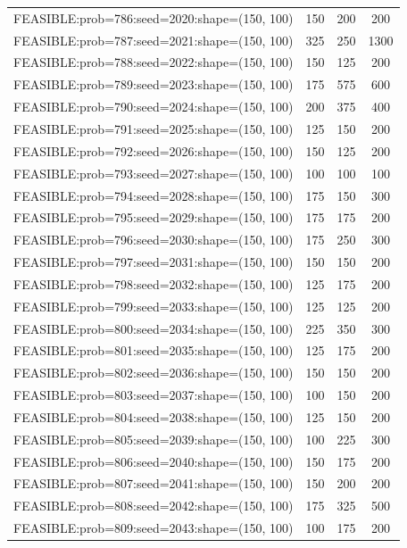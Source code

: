 \begin{longtable}{lccc}
FEASIBLE:prob=786:seed=2020:shape=(150, 100) &  150 &   200 &    200 \\
FEASIBLE:prob=787:seed=2021:shape=(150, 100) &  325 &   250 &   1300 \\
FEASIBLE:prob=788:seed=2022:shape=(150, 100) &  150 &   125 &    200 \\
FEASIBLE:prob=789:seed=2023:shape=(150, 100) &  175 &   575 &    600 \\
FEASIBLE:prob=790:seed=2024:shape=(150, 100) &  200 &   375 &    400 \\
FEASIBLE:prob=791:seed=2025:shape=(150, 100) &  125 &   150 &    200 \\
FEASIBLE:prob=792:seed=2026:shape=(150, 100) &  150 &   125 &    200 \\
FEASIBLE:prob=793:seed=2027:shape=(150, 100) &  100 &   100 &    100 \\
FEASIBLE:prob=794:seed=2028:shape=(150, 100) &  175 &   150 &    300 \\
FEASIBLE:prob=795:seed=2029:shape=(150, 100) &  175 &   175 &    200 \\
FEASIBLE:prob=796:seed=2030:shape=(150, 100) &  175 &   250 &    300 \\
FEASIBLE:prob=797:seed=2031:shape=(150, 100) &  150 &   150 &    200 \\
FEASIBLE:prob=798:seed=2032:shape=(150, 100) &  125 &   175 &    200 \\
FEASIBLE:prob=799:seed=2033:shape=(150, 100) &  125 &   125 &    200 \\
FEASIBLE:prob=800:seed=2034:shape=(150, 100) &  225 &   350 &    300 \\
FEASIBLE:prob=801:seed=2035:shape=(150, 100) &  125 &   175 &    200 \\
FEASIBLE:prob=802:seed=2036:shape=(150, 100) &  150 &   150 &    200 \\
FEASIBLE:prob=803:seed=2037:shape=(150, 100) &  100 &   150 &    200 \\
FEASIBLE:prob=804:seed=2038:shape=(150, 100) &  125 &   150 &    200 \\
FEASIBLE:prob=805:seed=2039:shape=(150, 100) &  100 &   225 &    300 \\
FEASIBLE:prob=806:seed=2040:shape=(150, 100) &  150 &   175 &    200 \\
FEASIBLE:prob=807:seed=2041:shape=(150, 100) &  150 &   200 &    200 \\
FEASIBLE:prob=808:seed=2042:shape=(150, 100) &  175 &   325 &    500 \\
FEASIBLE:prob=809:seed=2043:shape=(150, 100) &  100 &   175 &    200 \\

\end{longtable}
